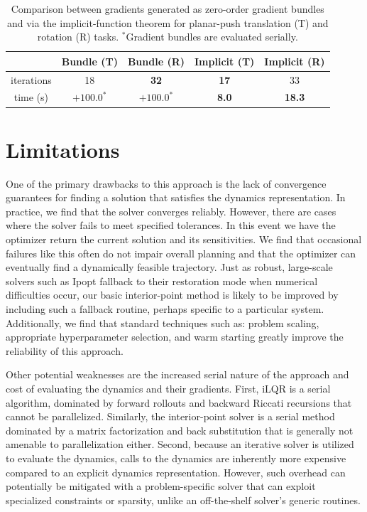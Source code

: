 \begin{table}[H]
	\centering
	\caption[Gradient comparison between implicit gradients and gradient bundles for planar-push task]{Comparison between gradients generated as zero-order gradient bundles and via the implicit-function theorem for planar-push translation (T) and rotation (R) tasks. $^*$Gradient bundles are evaluated serially.}
	\begin{tabular}{c c c c c}
		\toprule
		&
		\textbf{Bundle (T)} &
		\textbf{Bundle (R)} &
		\textbf{Implicit (T)} &
		\textbf{Implicit (R)}
		\\
		\toprule
		iterations & 18 & \textbf{32} & \textbf{17} & 33 \\
		time (s) & $+100.0^*$ & $+100.0^*$ & \textbf{8.0} & \textbf{18.3} \\
		\toprule
	\end{tabular}
	\label{od_planarpush_results}
\end{table}

\section{Limitations}\label{od_limitations}

One of the primary drawbacks to this approach is the lack of convergence guarantees for finding a solution that satisfies the dynamics representation. In practice, we find that the solver converges reliably. However, there are cases where the solver fails to meet specified tolerances. In this event we have the optimizer return the current solution and its sensitivities. We find that occasional failures like this often do not impair overall planning and that the optimizer can eventually find a dynamically feasible trajectory. Just as robust, large-scale solvers such as Ipopt \cite{wachter2006implementation} fallback to their restoration mode when numerical difficulties occur, our basic interior-point method is likely to be improved by including such a fallback routine, perhaps specific to a particular system. Additionally, we find that standard techniques such as: problem scaling, appropriate hyperparameter selection, and warm starting greatly improve the reliability of this approach.

Other potential weaknesses are the increased serial nature of the approach and cost of evaluating the dynamics and their gradients. First, iLQR is a serial algorithm, dominated by forward rollouts and backward Riccati recursions that cannot be parallelized. Similarly, the interior-point solver is a serial method dominated by a matrix factorization and back substitution that is generally not amenable to parallelization either. Second, because an iterative solver is utilized to evaluate the dynamics, calls to the dynamics are inherently more expensive compared to an explicit dynamics representation. However, such overhead can potentially be mitigated with a problem-specific solver that can exploit specialized constraints or sparsity, unlike an off-the-shelf solver's generic routines.

